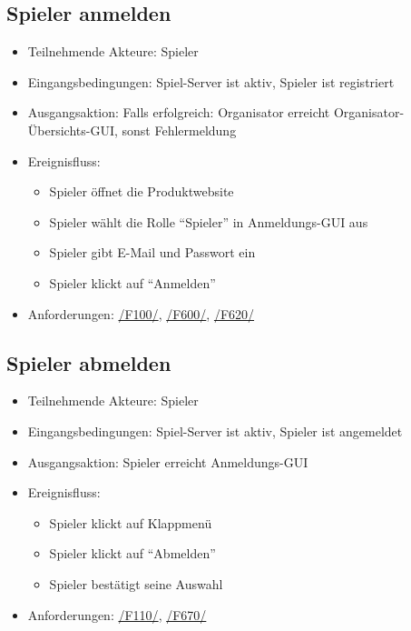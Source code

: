 \documentclass[a4paper]{scrreprt}
\begin{document}
    \subsection{Spieler anmelden}
    \begin{itemize}
        \item Teilnehmende Akteure: \Gls{Spieler}

        \item Eingangsbedingungen: \Gls{Spiel-Server} ist aktiv, \Gls{Spieler} ist registriert
        \item Ausgangsaktion: Falls erfolgreich: \Gls{Organisator} erreicht Organisator-Übersichts-GUI, sonst Fehlermeldung %

        \item Ereignisfluss:
        \begin{itemize}
            \item \Gls{Spieler} öffnet die Produktwebsite
            \item \Gls{Spieler} wählt die Rolle \enquote{\Gls{Spieler}} in Anmeldungs-GUI aus
            \item \Gls{Spieler} gibt E-Mail und Passwort ein
            \item \Gls{Spieler} klickt auf \enquote{Anmelden}
        \end{itemize}
        \item Anforderungen: \hyperlink{F100}{/F100/}, \hyperlink{F600}{/F600/}, \hyperlink{F620}{/F620/}
    \end{itemize}

    \subsection{Spieler abmelden}
    \begin{itemize}
        \item Teilnehmende Akteure: \Gls{Spieler}
        \item Eingangsbedingungen: \Gls{Spiel-Server} ist aktiv, \Gls{Spieler} ist angemeldet
        \item Ausgangsaktion: \Gls{Spieler} erreicht Anmeldungs-GUI
        \item Ereignisfluss:
        \begin{itemize}
            \item \Gls{Spieler} klickt auf Klappmenü
            \item \Gls{Spieler} klickt auf \enquote{Abmelden}
            \item \Gls{Spieler} bestätigt seine Auswahl
        \end{itemize}
        \item Anforderungen: \hyperlink{F110}{/F110/}, \hyperlink{F670}{/F670/}
    \end{itemize}
\end{document}
